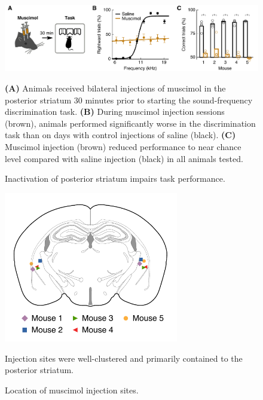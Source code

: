 \begin{figure}[!p]
  \begin{center}
    \includegraphics[width=5in]{figures/chapter2/Fig3_muscimol_inactivation}%
  \end{center}
  \caption{Inactivation of posterior striatum impairs task performance.}{\textbf{(A)} Animals received bilateral injections of muscimol in the posterior
  striatum 30 minutes prior to starting the sound-frequency discrimination task. \textbf{(B)} During muscimol injection sessions (brown), animals performed significantly worse in the discrimination task than on days with control injections of saline (black). \textbf{(C)} Muscimol injection (brown) reduced performance to near chance level compared with saline injection (black) in all animals tested.}
\end{figure}


\begin{figure}[!p]
  \begin{center}
    \includegraphics[width=3in]{figures/chapter2/SFig3_muscimol_injection_sites}%
  \end{center}
  \caption{Location of muscimol injection sites.}{Injection sites were well-clustered and primarily contained to the posterior striatum.}
\end{figure}


